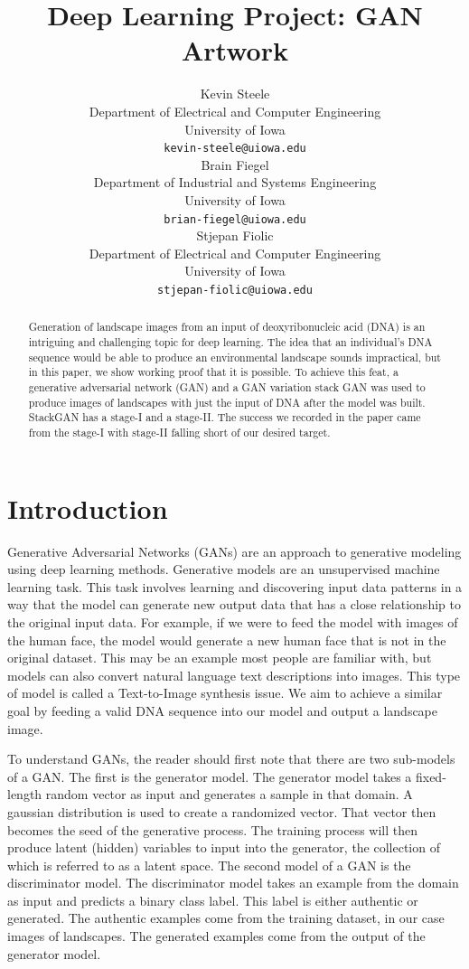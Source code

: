 \documentclass{article}
\title{Deep Learning Project: GAN Artwork}
\author{
	Kevin Steele \\
	Department of Electrical and Computer Engineering \\
	University of Iowa\\
	\texttt{kevin-steele@uiowa.edu} \\
	\And
	Brain Fiegel \\
	Department of Industrial and Systems Engineering \\
	University of Iowa\\
	\texttt{brian-fiegel@uiowa.edu} \\
	\And
	Stjepan Fiolic \\
	Department of Electrical and Computer Engineering \\
	University of Iowa\\
	\texttt{stjepan-fiolic@uiowa.edu} \\
}
\begin{document}
	\maketitle
	
	\begin{abstract}
		Generation of landscape images from an input of deoxyribonucleic acid (DNA) is an intriguing and challenging topic for deep learning. The idea that an individual’s DNA sequence would be able to produce an environmental landscape sounds impractical, but in this paper, we show working proof that it is possible. To achieve this feat, a generative adversarial network (GAN) and a GAN variation stack GAN was used to produce images of landscapes with just the input of DNA after the model was built. StackGAN has a stage-I and a stage-II. The success we recorded in the paper came from the stage-I with stage-II falling short of our desired target. 
	\end{abstract}
	
	
	
	
	\section{Introduction}
	\label{sec:intro}
	
	Generative Adversarial Networks (GANs) are an approach to generative modeling using deep learning methods. Generative models are an unsupervised machine learning task.  This task involves learning and discovering input data patterns in a way that the model can generate new output data that has a close relationship to the original input data. For example, if we were to feed the model with images of the human face, the model would generate a new human face that is not in the original dataset. This may be an example most people are familiar with, but models can also convert natural language text descriptions into images.  This type of model is called a Text-to-Image synthesis issue. We aim to achieve a similar goal by feeding a valid DNA sequence into our model and output a landscape image. 

	To understand GANs, the reader should first note that there are two sub-models of a GAN. The first is the generator model. The generator model takes a fixed-length random vector as input and generates a sample in that domain. A gaussian distribution is used to create a randomized vector. That vector then becomes the seed of the generative process. The training process will then produce latent (hidden) variables to input into the generator, the collection of which is referred to as a latent space. The second model of a GAN is the discriminator model. The discriminator model takes an example from the domain as input and predicts a binary class label. This label is either authentic or generated. The authentic examples come from the training dataset, in our case images of landscapes. The generated examples come from the output of the generator model.  
\end{document}
